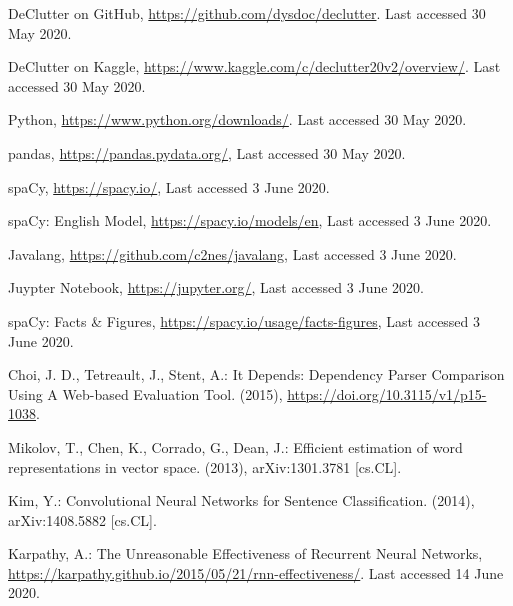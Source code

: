 \documentclass[runningheads]{llncs}
\begin{document}
%
%
\newpage
\begin{thebibliography}{8}
DeClutter on GitHub, \url{https://github.com/dysdoc/declutter}. Last accessed 30 May 2020.

DeClutter on Kaggle, \url{https://www.kaggle.com/c/declutter20v2/overview/}. Last accessed 30 May 2020.

Python, \url{https://www.python.org/downloads/}. Last accessed 30 May 2020.

pandas, \url{https://pandas.pydata.org/}, Last accessed 30 May 2020.

spaCy, \url{https://spacy.io/}, Last accessed 3 June 2020.

spaCy: English Model, \url{https://spacy.io/models/en}, Last accessed 3 June 2020.

Javalang, \url{https://github.com/c2nes/javalang}, Last accessed 3 June 2020.

Juypter Notebook, \url{https://jupyter.org/}, Last accessed 3 June 2020.

spaCy: Facts \& Figures, \url{https://spacy.io/usage/facts-figures}, Last accessed 3 June 2020.

Choi, J. D., Tetreault, J., Stent, A.: It Depends: Dependency Parser Comparison Using A Web-based Evaluation Tool. (2015), \url{https://doi.org/10.3115/v1/p15-1038}.

Mikolov, T., Chen, K., Corrado, G., Dean, J.: Efficient estimation of word representations in vector space. (2013), arXiv:1301.3781 [cs.CL].

Kim, Y.: Convolutional Neural Networks for Sentence Classification. (2014), arXiv:1408.5882 [cs.CL].

Karpathy, A.: The Unreasonable Effectiveness of Recurrent Neural Networks, \url{https://karpathy.github.io/2015/05/21/rnn-effectiveness/}. Last accessed 14 June 2020.

\end{thebibliography}
\end{document}
